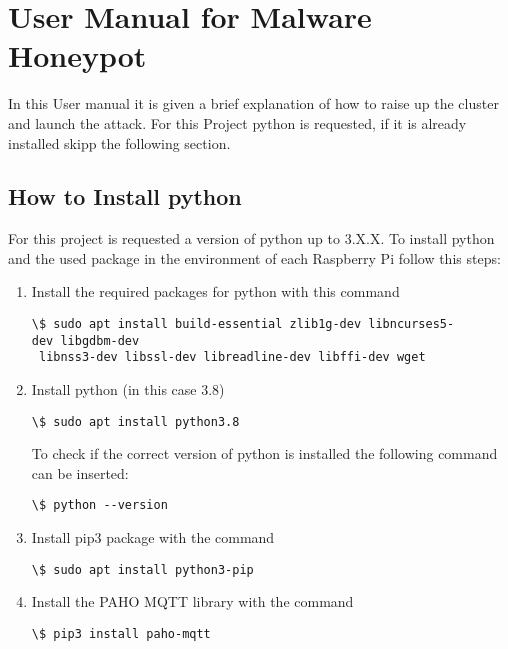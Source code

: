 \chapter{User Manual for Malware Honeypot}
\label{usermanual}
In this User manual it is given a brief explanation of how to raise up the cluster and launch the attack. For this Project python is requested, if it is already installed skipp the following section.
\section{How to Install python}
For this project is requested a version of python up to 3.X.X. To install python and the used package in the environment of each Raspberry Pi follow this steps:
\begin{enumerate}
\item Install the required packages for python with this command  \begin{verbatim}\$ sudo apt install build-essential zlib1g-dev libncurses5-
dev libgdbm-dev
 libnss3-dev libssl-dev libreadline-dev libffi-dev wget\end{verbatim}
\item Install python (in this case 3.8) \begin{verbatim}\$ sudo apt install python3.8\end{verbatim} 
To check if the correct version of python is installed the following command can be inserted: \begin{verbatim}\$ python --version\end{verbatim}
\item Install pip3 package with the command  \begin{verbatim}\$ sudo apt install python3-pip\end{verbatim} 
\item Install the PAHO MQTT library with the command  \begin{verbatim}\$ pip3 install paho-mqtt\end{verbatim} 
\end{enumerate}

